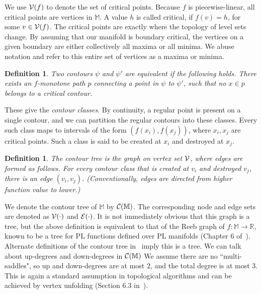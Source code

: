 \documentclass[11pt]{article}
\newcommand{\ignore}[1]{}
\newtheorem{definition}[theorem]{Definition}
\theoremstyle{definition}
\newcommand{\cC}{{\cal C}}
\newcommand{\cE}{{\cal E}}
\newcommand{\cV}{{\cal V}}
\newcommand{\MM}{\mathbb{M}}
\newcommand{\RR}{\mathbb{R}}
\newcommand{\reeb}{\cC}
\begin{document}
We use $\cV(f)$ to denote the set of critical points.
Because $f$ is piecewise-linear, all critical points are vertices in $\MM$. 
A value $h$ is called critical, if $f(v) = h$, for some $v \in \cV(f)$. 
The critical points are exactly where the topology of level sets change.
By assuming that our manifold is boundary critical, the vertices on a given boundary are either collectively all maxima or all minima.  
We abuse notation and refer to this entire set of vertices as a maxima or minima.


\ignore{
The Morse assumption
implies that all critical points have distinct values. A contour that involves a critical
point is also denoted as critical. Note that the vertices in a boundary face collectively behaves like an extremum.
Abusing notation, the term ``critical point", ``maxima", and ``minima" will include boundaries.
Critical values include these boundary values. By boundary criticality, all contours are themselves
represented as $d-1$-dimensional simplicial complexes.
}

\begin{definition} \label{def:equiv} Two contours $\psi$ and $\psi'$ are equivalent 
if the following holds. There exists an $f$-monotone path $p$ connecting a point in $\psi$ to $\psi'$,
such that no $x \in p$ belongs to a critical contour.
\end{definition}

These give the \emph{contour classes}. By continuity, a regular point is present on a single contour,
and we can partition the regular contours into these classes. Every such class maps to intervals
of the form $(f(x_i),f(x_j))$, where $x_i, x_j$ are critical points. Such a class is said
to be created at $x_i$ and destroyed at $x_j$. 

\begin{definition} \label{def:tree} The contour tree is the graph on vertex set $\cV$, where
edges are formed as follows. For every contour class that is created at $v_i$ and destroyed $v_j$,
there is an edge $(v_i,v_j)$. (Conventionally, edges are directed from higher function value to lower.)
\end{definition}

We denote the contour tree of $\MM$
by $\reeb(\MM)$. The corresponding node and edge sets are denoted as $\cV(\cdot)$ and $\cE(\cdot)$.
It is not immediately obvious that this graph is a tree, but the above definition is equivalent to that of the Reeb graph of $f:\MM \rightarrow \RR$, 
known to be a tree for PL functions defined over PL manifolds (Chapter 6 of~\cite{HaEd10}). Alternate definitions of the contour tree
in~\cite{csa-cctad-00} imply this is a tree. We can talk about up-degrees and down-degrees in $\reeb(\MM)$
We assume there are no ``multi-saddles", so up and down-degrees are at most $2$, and the total degree is at most $3$. 
This is again a standard assumption in topological algorithms and can be achieved by vertex unfolding (Section 6.3 in~\cite{HaEd10}).
\end{document}
